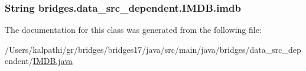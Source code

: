 \subsubsection[{imdb}]{\setlength{\rightskip}{0pt plus 5cm}String bridges.\+data\+\_\+src\+\_\+dependent.\+I\+M\+D\+B.\+imdb\hspace{0.3cm}{\ttfamily [protected]}}\label{classbridges_1_1data__src__dependent_1_1_i_m_d_b_a2913407abe6019a396d4a2ac086283df}


The documentation for this class was generated from the following file\+:\begin{DoxyCompactItemize}
\item 
/\+Users/kalpathi/gr/bridges/bridges17/java/src/main/java/bridges/data\+\_\+src\+\_\+dependent/\hyperlink{_i_m_d_b_8java}{I\+M\+D\+B.\+java}\end{DoxyCompactItemize}
